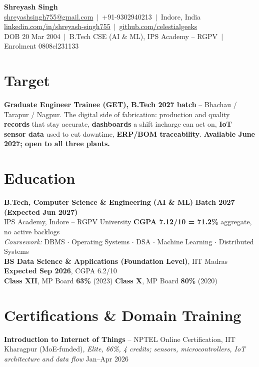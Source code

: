 \documentclass[letterpaper,11pt]{article}
\begin{document}
\begin{center}
  {\LARGE \bfseries Shreyash Singh}\\[3pt]
  \href{mailto:shreyashsingh755@gmail.com}{shreyashsingh755@gmail.com} \,$|$\, +91-9302940213 \,$|$\, Indore, India \\
  \href{https://linkedin.com/in/shreyash-singh755}{linkedin.com/in/shreyash-singh755} \,$|$\,
  \href{https://github.com/celestialgeeks}{github.com/celestialgeeks} \\[2pt]
  \small DOB 20 Mar 2004 \,$|$\, B.Tech CSE (AI \& ML), IPS Academy -- RGPV \,$|$\, Enrolment 0808cl231133
\end{center}

\section{Target}
\textbf{Graduate Engineer Trainee (GET), B.Tech 2027 batch} -- Bhachau / Tarapur / Nagpur. The digital
side of fabrication: production and quality \textbf{records} that stay accurate, \textbf{dashboards} a
shift incharge can act on, \textbf{IoT sensor data} used to cut downtime, \textbf{ERP/BOM traceability}.
\textbf{Available June 2027; open to all three plants.}

\section{Education}
\textbf{B.Tech, Computer Science \& Engineering (AI \& ML)} \hfill \textbf{Batch 2027 (Expected Jun 2027)} \\
IPS Academy, Indore -- RGPV University \hfill \textbf{CGPA 7.12/10 = 71.2\%} aggregate, no active backlogs \\
\textit{Coursework:} DBMS $\cdot$ Operating Systems $\cdot$ DSA $\cdot$ Machine Learning $\cdot$ Distributed Systems \\[2pt]
\textbf{BS Data Science \& Applications (Foundation Level)}, IIT Madras \hfill \textbf{Expected Sep 2026}, CGPA 6.2/10 \\
\textbf{Class XII}, MP Board \textbf{63\%} (2023) \hfill \textbf{Class X}, MP Board \textbf{80\%} (2020)

\section{Certifications \& Domain Training}
\textbf{Introduction to Internet of Things} -- NPTEL Online Certification, IIT Kharagpur (MoE-funded),
\textit{Elite, 66\%, 4 credits; sensors, microcontrollers, IoT architecture and data flow} \hfill Jan--Apr 2026
\end{document}
